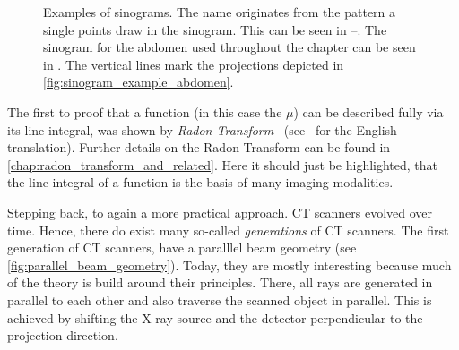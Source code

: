 \begin{figure}
	\centering
	\caption{Examples of sinograms. The name originates from the pattern a single points draw in
		the sinogram. This can be seen in
		--. The
		sinogram for the abdomen  used throughout the
		chapter can be seen in . The vertical lines
		mark the projections depicted in \autoref{fig:sinogram_example_abdomen}.
	}\label{fig:sinogram_complete}
\end{figure}

The first to proof that a function (in this case the \(\mu\)) can be described fully via its line
integral, was shown by \textit{Radon Transform}~\cite{radon_uber_1917}
(see~\cite{radon_determination_1986} for the English translation). Further details on the Radon
Transform can be found in \autoref{chap:radon_transform_and_related}. Here it should just be
highlighted, that the line integral of a function is the basis of many imaging modalities.

Stepping back, to again a more practical approach. CT scanners evolved over time. Hence, there do
exist many so-called \textit{generations} of CT scanners. The first generation of CT scanners, have
a paralllel beam geometry (see \autoref{fig:parallel_beam_geometry}). Today, they are mostly
interesting because much of the theory is build around their principles. There, all rays are
generated in parallel to each other and also traverse the scanned object in parallel. This is
achieved by shifting the X-ray source and the detector perpendicular to the projection direction.

